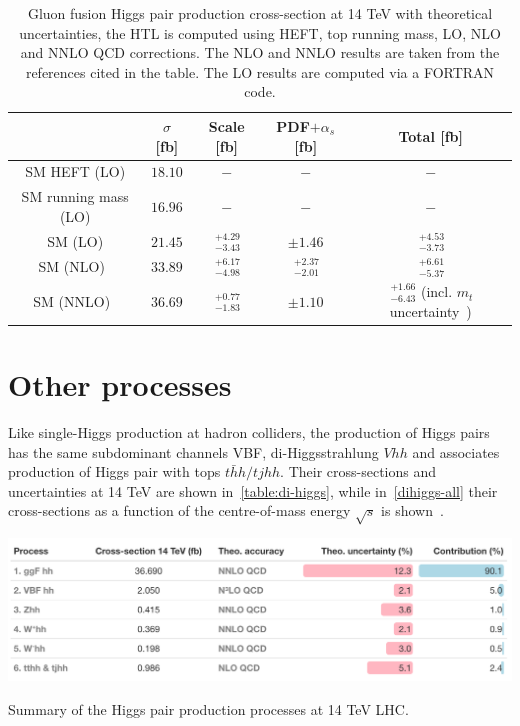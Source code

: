 \begin{table}
	\centering
	\begin{tabular}{ccccc}
		\toprule
		& $ \sigma$	[fb] & Scale [fb] & PDF$+\alpha_s$ [fb]& Total [fb] \\
		\midrule
		SM HEFT  (LO)      &  $ 18.10$    &   $-$      & $-$   &  $-$ \\
		SM   running mass (LO)  &  $ 16.96$    &   $ -$   & $-$   &  $-$ \\
		SM    (LO)  &  $ 21.45$    &   $ \,^{+4.29}_{-3.43}$   & $\pm 1.46$   &  $ \,^{+4.53}_{-3.73}$ \\
		SM   (NLO)~\cite{Baglio:2012np}  &  $ 33.89$   &   $ \,^{+6.17}_{-4.98}$   & $ \,^{+2.37}_{-2.01}$   &  $ \,^{+6.61}_{-5.37}$ \\
		SM   (NNLO)~\cite{Grazzini:2018bsd}  &  $36.69$    &    $ \,^{+0.77}_{-1.83}$   & $\pm 1.10$   &  $ \,^{+1.66}_{-6.43}$ {\tiny(incl. $m_t$ uncertainty~\cite{Baglio:2020wgt})} \\
		\bottomrule
	\end{tabular}
	\caption{Gluon fusion Higgs pair production cross-section at 14 TeV with theoretical  uncertainties, the HTL is computed using HEFT, top running mass, LO, NLO and NNLO QCD corrections. The NLO and NNLO results are taken from the references cited in the table. The LO results are computed via a FORTRAN code.}
	\label{ggf_xsres}
\end{table}

\section{Other processes\label{otherhh}  }
Like single-Higgs production at hadron colliders, the production of Higgs pairs has the same subdominant channels VBF, di-Higgsstrahlung $ Vhh$ and associates production of Higgs pair with tops $t\bar hh /t j hh$. Their cross-sections and uncertainties at 14 TeV are shown in~\autoref{table:di-higgs}, while in~\autoref{dihiggs-all} their cross-sections as a function of the centre-of-mass energy $\sqrt{s}$ is shown~\cite{DiMicco:2019ngk}. 
\begin{table}[htbp!]
	\includegraphics[width=1\textwidth]{hh-table}
	\caption{ Summary of the Higgs pair production processes at 14 TeV LHC. \label{table:di-higgs} }
\end{table}
